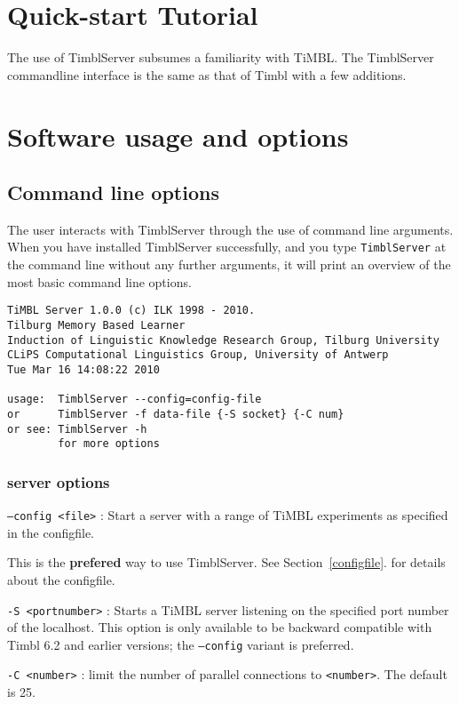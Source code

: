\documentclass{report}
\begin{document}
\chapter{Quick-start Tutorial}
\label{tutorial}

The use of TimblServer subsumes a familiarity with TiMBL.  The
TimblServer commandline interface is the same as that of Timbl with a
few additions.


\chapter{Software usage and options}
\label{reference}

\section{Command line options}
\label{commandline}

The user interacts with TimblServer through the use of command line
arguments.  When you have installed TimblServer successfully, and you
type {\tt TimblServer} at the command line without any further
arguments, it will print an overview of the most basic command line
options.

{\footnotesize
\begin{verbatim}
TiMBL Server 1.0.0 (c) ILK 1998 - 2010.
Tilburg Memory Based Learner
Induction of Linguistic Knowledge Research Group, Tilburg University
CLiPS Computational Linguistics Group, University of Antwerp
Tue Mar 16 14:08:22 2010

usage:  TimblServer --config=config-file
or      TimblServer -f data-file {-S socket} {-C num}
or see: TimblServer -h
        for more options
\end{verbatim}
}

\subsection{server options}

\begin{description}

\item {\tt --config <file>} : Start a server with a range of TiMBL experiments as specified in the configfile.

This is the {\bf prefered} way to use TimblServer. See Section~\ref{configfile}. for details about the configfile.

\item {\tt -S <portnumber>} : Starts a TiMBL server listening on the
  specified port number of the localhost.  This option is only
  available to be backward compatible with Timbl 6.2 and earlier
  versions; the {\tt --config} variant is preferred.
\item {\tt -C <number>} : limit the number of parallel connections to
  {\tt <number>}. The default is 25.

\end{description}
\end{document}
